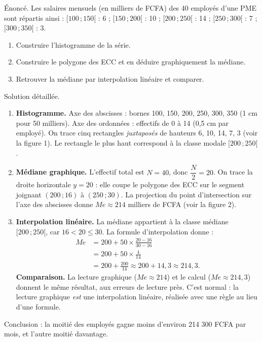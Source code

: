 \documentclass[11pt]{article}
\begin{document}
\begin{exoresolu}
Énoncé. Les salaires mensuels (en milliers de FCFA) des 40 employés d'une PME sont répartis ainsi : $[100\,;150[$ : 6 ; $[150\,;200[$ : 10 ; $[200\,;250[$ : 14 ; $[250\,;300[$ : 7 ; $[300\,;350[$ : 3.
\begin{enumerate}
\item Construire l'histogramme de la série.
\item Construire le polygone des ECC et en déduire graphiquement la médiane.
\item Retrouver la médiane par interpolation linéaire et comparer.
\end{enumerate}
\tcblower
Solution détaillée.
\begin{enumerate}
\item \textbf{Histogramme.} Axe des abscisses : bornes 100, 150, 200, 250, 300, 350 (1 cm pour 50 milliers). Axe des ordonnées : effectifs de 0 à 14 (0,5 cm par employé). On trace cinq rectangles \emph{juxtaposés} de hauteurs 6, 10, 14, 7, 3 (voir la figure 1). Le rectangle le plus haut correspond à la classe modale $[200\,;250[$.
\item \textbf{Médiane graphique.} L'effectif total est $N = 40$, donc $\dfrac{N}{2} = 20$. On trace la droite horizontale $y = 20$ : elle coupe le polygone des ECC sur le segment joignant $(200\,;16)$ à $(250\,;30)$. La projection du point d'intersection sur l'axe des abscisses donne $Me \approx 214$ milliers de FCFA (voir la figure 2).
\item \textbf{Interpolation linéaire.} La médiane appartient à la classe médiane $[200\,;250[$, car $16 < 20 \leq 30$. La formule d'interpolation donne :
\begin{align*}
Me &= 200 + 50 \times \frac{20 - 16}{30 - 16} \\
   &= 200 + 50 \times \frac{4}{14} \\
   &= 200 + \frac{200}{14} \approx 200 + 14{,}3 \approx 214{,}3.
\end{align*}
\textbf{Comparaison.} La lecture graphique ($Me \approx 214$) et le calcul ($Me \approx 214{,}3$) donnent le même résultat, aux erreurs de lecture près. C'est normal : la lecture graphique \emph{est} une interpolation linéaire, réalisée avec une règle au lieu d'une formule.
\end{enumerate}
Conclusion : la moitié des employés gagne moins d'environ 214 300 FCFA par mois, et l'autre moitié davantage.
\end{exoresolu}
\end{document}
